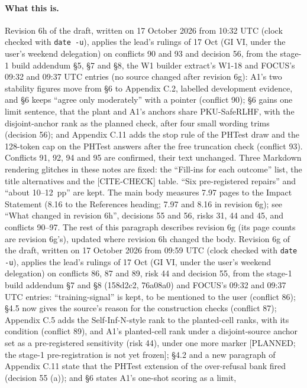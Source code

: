 \documentclass{article}
\theoremstyle{plain}
\theoremstyle{definition}
\theoremstyle{remark}
\begin{document}
\paragraph{What this is.}
Revision 6h of the draft, written on 17 October 2026 from 10:32 UTC (clock
checked with \texttt{date -u}), applies the lead's rulings of 17 Oct (GI VI,
under the user's weekend delegation) on conflicts 90 and 93 and decision 56,
from the stage-1 build addendum \S{}5, \S{}7 and \S{}8, the W1 builder extract's
W1-18 and FOCUS's 09:32 and 09:37 UTC entries (no source changed after revision
6g): A1's two stability figures move from \S{}6 to Appendix C.2, labelled
development evidence, and \S{}6 keeps ``agree only moderately'' with a pointer
(conflict 90); \S{}6 gains one limit sentence, that the plant and A1's anchors
share PKU-SafeRLHF, with the disjoint-anchor rank as the planned check, after
four small wording trims (decision 56); and Appendix C.11 adds the stop rule of
the PHTest draw and the 128-token cap on the PHTest answers after the free
truncation check (conflict 93). Conflicts 91, 92, 94 and 95 are confirmed, their
text unchanged. Three Markdown rendering glitches in these notes are fixed: the
``Fill-ins for each outcome'' list, the title alternatives and the [CITE-CHECK]
table. ``Six pre-registered repairs'' and ``about 10--12~pp'' are kept. The main
body measures 7.97 pages to the Impact Statement (8.16 to the References
heading; 7.97 and 8.16 in revision 6g); see ``What changed in revision 6h'',
decisions 55 and 56, risks 31, 44 and 45, and conflicts 90--97. The rest of this
paragraph describes revision 6g (its page counts are revision 6g's), updated
where revision 6h changed the body. Revision 6g of the draft, written on 17
October 2026 from 09:59 UTC (clock checked with \texttt{date -u}), applies the
lead's rulings of 17 Oct (GI VI, under the user's weekend delegation) on
conflicts 86, 87 and 89, risk 44 and decision 55, from the stage-1 build
addendum \S{}7 and \S{}8 (158d2c2, 76a08a0) and FOCUS's 09:32 and 09:37 UTC
entries: ``training-signal'' is kept, to be mentioned to the user (conflict 86);
\S{}4.5 now gives the source's reason for the construction checks (conflict 87);
Appendix C.5 adds the Self-Inf-N-style rank to the planted-cell ranks, with its
condition (conflict 89), and A1's planted-cell rank under a disjoint-source
anchor set as a pre-registered sensitivity (risk 44), under one more marker
[PLANNED; the stage-1 pre-registration is not yet frozen]; \S{}4.2 and a new
paragraph of Appendix C.11 state that the PHTest extension of the over-refusal
bank fired (decision 55 (a)); and \S{}6 states A1's one-shot scoring as a limit,
\end{document}
